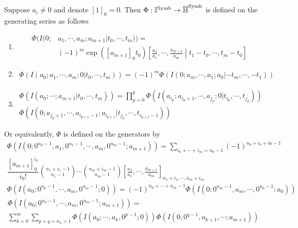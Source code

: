 \begin{definition}\cite{ZDHZ_HopfAlgebrasOfMultiplePolylogarithmsAndHolomorphicOneForms}
Suppose $a_i\neq 0$ and denote $[1]_0=0$. Then $\Phi:\mathbb I^{\operatorname{Symb}}\to\overline{\mathbb H}^{\operatorname{Symb}}$ is defined on the generating series as follows
\begin{enumerate}
\item 
\begin{equation}
\begin{aligned}
\Phi(I(0;&a_1,\cdots,a_m;a_{m+1}|t_0,\cdots,t_m))=\\
&(-1)^m\exp([a_{m+1}]_0t_0)\left[\frac{a_2}{a_1},\cdots,\frac{a_{m+1}}{a_m}\middle|t_1-t_0,\cdots,t_m-t_0\right]
\end{aligned}
\end{equation}
\item 
\begin{multline}
\Phi(I(a_0;a_1,\cdots,a_m;0|t_0,\cdots,t_m))=(-1)^m\Phi(I(0;a_m,\cdots,a_1;a_0|-t_m,\cdots,-t_1))
\end{multline}
\item 
\begin{multline}
\Phi(I(a_0;\cdots;a_{m+1}|t_0,\cdots,t_m))=\prod_{p=0}^k\Phi(I(a_{i_p};a_{i_p+1},\cdots,a_{j_p};0|t_{i_p},\cdots,t_{j_p}))\\
\Phi(I(0;a_{j_p+1},\cdots,a_{i_{p+1}-1};a_{i_{p+1}}|t_{j_p},\cdots,t_{i_{p+1}-1}))
\end{multline}
\end{enumerate}
Or equivalently, $\Phi$ is defined on the generators by
\begin{multline}\label{eq: Phi(I(0;0^n0-1,...))}
\Phi(I(0;0^{n_0-1},a_{1},0^{n_1-1},\cdots,a_{m},0^{n_m-1};a_{m+1}))=\sum_{i_0+\cdots+i_m=n_0-1}(-1)^{n_0+i_0+m-1}\\
\dfrac{[a_{m+1}]_0^{i_0}}{i_0!}\binom{n_1+i_1-1}{n_1-1}\cdots\binom{n_m+i_m-1}{n_m-1}\left[\frac{a_{2}}{a_{1}},\cdots,\frac{a_{m+1}}{a_{m}}\right]_{n_1+i_1,\cdots,n_m+i_m}
\end{multline}
\begin{multline}
\Phi(I(a_{0};0^{n_0-1},\cdots,a_{m},0^{n_m-1};0))=(-1)^{n_0+\cdots+n_m-1}\Phi(I(0;0^{n_m-1},a_{m},\cdots,0^{n_0-1};a_{0}))
\end{multline}
\begin{multline}
\Phi(I(a_{0};0^{n_0-1},\cdots,a_{m},0^{n_m-1};a_{m+1}))=\\
\sum_{k=0}^m\sum_{p+q=n_k>1}\Phi(I(a_{0};\cdots,a_{k},0^{p-1};0))\Phi(I(0,0^{q-1},a_{k+1},\cdots;a_{m+1}))
\end{multline}
\end{definition}

